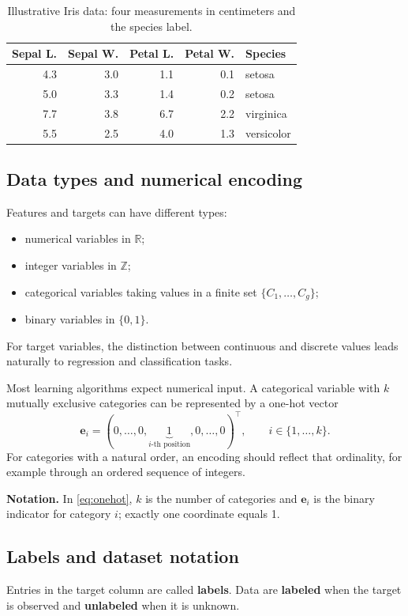 \documentclass[11pt,a4paper]{article}
\newenvironment{formulabox}{\par\smallskip\begingroup\small\noindent\textbf{\color{MidGray}Notation.}\enspace}{\par\endgroup\smallskip}
\newcommand{\vect}[1]{\bm{#1}}
\newcommand{\R}{\mathbb{R}}
\newcommand{\Z}{\mathbb{Z}}
\begin{document}
\begin{table}[htbp]
\centering
\caption{Illustrative Iris data: four measurements in centimeters and the species label.}
\begin{tabular}{@{}rrrrl@{}}
\toprule
\textbf{Sepal L.} & \textbf{Sepal W.} & \textbf{Petal L.} & \textbf{Petal W.} & \textbf{Species}\\
\midrule
4.3 & 3.0 & 1.1 & 0.1 & setosa\\
5.0 & 3.3 & 1.4 & 0.2 & setosa\\
7.7 & 3.8 & 6.7 & 2.2 & virginica\\
5.5 & 2.5 & 4.0 & 1.3 & versicolor\\
\bottomrule
\end{tabular}
\end{table}

\subsection{Data types and numerical encoding}
Features and targets can have different types:
\begin{itemize}
  \item numerical variables in $\R$;
  \item integer variables in $\Z$;
  \item categorical variables taking values in a finite set $\{C_1,\ldots,C_g\}$;
  \item binary variables in $\{0,1\}$.
\end{itemize}
For target variables, the distinction between continuous and discrete values leads naturally to regression and classification tasks.

Most learning algorithms expect numerical input. A categorical variable with $k$ mutually exclusive categories can be represented by a one-hot vector
\begin{equation}
\vect e_i=(0,\ldots,0,\underbrace{1}_{i\text{-th position}},0,\ldots,0)^\top,
\qquad i\in\{1,\ldots,k\}.
\label{eq:onehot}
\end{equation}
For categories with a natural order, an encoding should reflect that ordinality, for example through an ordered sequence of integers.

\begin{formulabox}
In \cref{eq:onehot}, $k$ is the number of categories and $\vect e_i$ is the binary indicator for category $i$; exactly one coordinate equals 1.
\end{formulabox}

\subsection{Labels and dataset notation}
Entries in the target column are called \textbf{labels}. Data are \textbf{labeled} when the target is observed and \textbf{unlabeled} when it is unknown.
\end{document}

